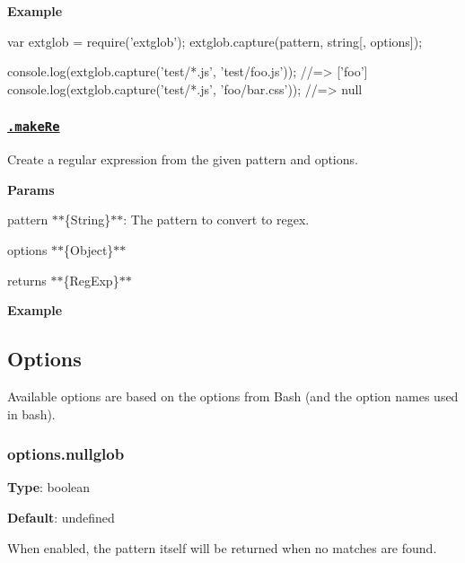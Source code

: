 {\bfseries Example}


\begin{DoxyCode}
var extglob = require('extglob');
extglob.capture(pattern, string[, options]);

console.log(extglob.capture('test/*.js', 'test/foo.js'));
//=> ['foo']
console.log(extglob.capture('test/*.js', 'foo/bar.css'));
//=> null
\end{DoxyCode}


\subsubsection*{\href{index.js#L281}{\tt .make\+Re}}

Create a regular expression from the given {\ttfamily pattern} and {\ttfamily options}.

{\bfseries Params}


\begin{DoxyItemize}
\item {\ttfamily pattern} $\ast$$\ast$\{String\}$\ast$$\ast$\+: The pattern to convert to regex.
\item {\ttfamily options} $\ast$$\ast$\{Object\}$\ast$$\ast$
\item {\ttfamily returns} $\ast$$\ast$\{Reg\+Exp\}$\ast$$\ast$
\end{DoxyItemize}

{\bfseries Example}




\subsection*{Options}

Available options are based on the options from Bash (and the option names used in bash).

\subsubsection*{options.\+nullglob}

{\bfseries Type}\+: {\ttfamily boolean}

{\bfseries Default}\+: {\ttfamily undefined}

When enabled, the pattern itself will be returned when no matches are found.


